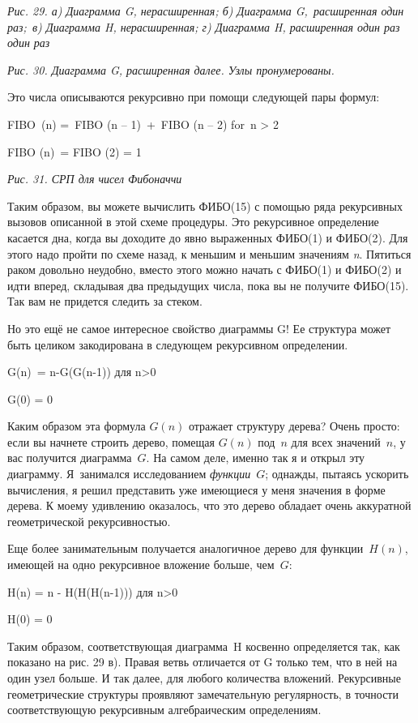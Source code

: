 \documentclass[../main.tex]{subfiles}
\begin{document}
\emph{Рис. 29. а) Диаграмма G, нерасширенная; б) Диаграмма G,~расширенная один раз;~в) Диаграмма H, нерасширенная; г) Диаграмма H, расширенная один раз один раз}

\emph{Рис. 30. Диаграмма G, расширенная далее. Узлы пронумерованы.}

Это числа описываются рекурсивно при помощи следующей пары формул:

FIBO~(n) =~FIBO (n \--- 1)~+~FIBO (n \--- 2) for~n \textgreater{} 2

FIBO (n)~= FIBO (2) = 1

\emph{Рис. 31. СРП для чисел Фибоначчи}

Таким образом, вы можете вычислить ФИБО(15) с помощью ряда рекурсивных вызовов описанной в этой схеме процедуры. Это рекурсивное определение касается дна, когда вы доходите до явно выраженных ФИБО(1) и ФИБО(2). Для этого надо пройти по схеме назад, к меньшим и меньшим значениям \emph{n}. Пятиться раком довольно неудобно, вместо этого можно начать с ФИБО(1) и ФИБО(2) и идти вперед, складывая два предыдущих числа, пока вы не получите ФИБО(15). Так вам не придется следить за стеком.

Но это ещё не самое интересное свойство диаграммы G! Ее структура может быть целиком закодирована в следующем рекурсивном определении.

G(n)~= n-G(G(n-1)) для n\textgreater0

G(0) = 0

Каким образом эта формула $G(n)$ отражает структуру дерева? Очень просто: если вы начнете строить дерево, помещая $G(n)$ под~$n$ для всех значений~$n$, у вас получится диаграмма~$G$. На самом деле, именно так я и открыл эту диаграмму. Я~занимался исследованием \emph{функции}~$G$; однажды, пытаясь ускорить вычисления, я решил представить уже имеющиеся у меня значения в форме дерева. К моему удивлению оказалось, что это дерево обладает очень аккуратной геометрической рекурсивностью.

Еще более занимательным получается аналогичное дерево для функции~$H(n)$, имеющей на одно рекурсивное вложение больше, чем~$G$:

H(n) = n - H(H(H(n-1))) для n\textgreater0

H(0) = 0

Таким образом, соответствующая диаграмма~H косвенно определяется так, как показано на рис. 29 в). Правая ветвь отличается от G только тем, что в ней на один узел больше. И так далее, для любого количества вложений. Рекурсивные геометрические структуры проявляют замечательную регулярность, в точности соответствующую рекурсивным алгебраическим определениям.
\end{document}
